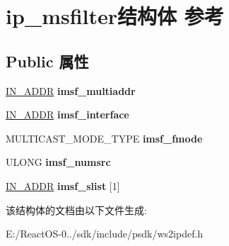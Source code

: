 \hypertarget{structip__msfilter}{}\section{ip\+\_\+msfilter结构体 参考}
\label{structip__msfilter}
\subsection*{Public 属性}
\begin{DoxyCompactItemize}
\item 
\mbox{\label{structip__msfilter_a4e589dd44f4a99c405063e7b8181e9d8}} 
\hyperlink{structin__addr}{I\+N\+\_\+\+A\+D\+DR} {\bfseries imsf\+\_\+multiaddr}
\item 
\mbox{\label{structip__msfilter_aa0293ac3415b2af758ee266caffe6cc2}} 
\hyperlink{structin__addr}{I\+N\+\_\+\+A\+D\+DR} {\bfseries imsf\+\_\+interface}
\item 
\mbox{\label{structip__msfilter_a5cc456e75c0d03e08ecc6eaf9ef6b70e}} 
M\+U\+L\+T\+I\+C\+A\+S\+T\+\_\+\+M\+O\+D\+E\+\_\+\+T\+Y\+PE {\bfseries imsf\+\_\+fmode}
\item 
\mbox{\label{structip__msfilter_a10ad3df914ef534e85b1fa3cf9bf3bcb}} 
U\+L\+O\+NG {\bfseries imsf\+\_\+numsrc}
\item 
\mbox{\label{structip__msfilter_abc3891e2cbcf0a9580f8f8219114bc10}} 
\hyperlink{structin__addr}{I\+N\+\_\+\+A\+D\+DR} {\bfseries imsf\+\_\+slist} \mbox{[}1\mbox{]}
\end{DoxyCompactItemize}


该结构体的文档由以下文件生成\+:\begin{DoxyCompactItemize}
\item 
E\+:/\+React\+O\+S-\/0../sdk/include/psdk/ws2ipdef.\+h\end{DoxyCompactItemize}
